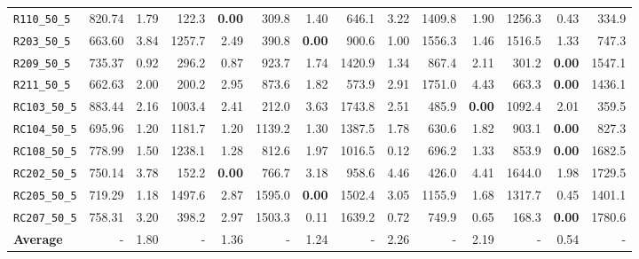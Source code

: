 \begin{table}[ht]
\begin{adjustbox}{width=\textwidth}
\begin{tabular}{l r r r @{\hspace{8pt}} r r @{\hspace{8pt}} r r @{\hspace{8pt}} r r @{\hspace{8pt}} r r @{\hspace{8pt}} r r @{\hspace{8pt}}}
\texttt{R110\_50\_5} & 820.74 & 1.79 & 122.3 & \textbf{0.00} & 309.8 & 1.40 & 646.1 & 3.22 & 1409.8 & 1.90 & 1256.3 & 0.43 & 334.9 \\
\texttt{R203\_50\_5} & 663.60 & 3.84 & 1257.7 & 2.49 & 390.8 & \textbf{0.00} & 900.6 & 1.00 & 1556.3 & 1.46 & 1516.5 & 1.33 & 747.3 \\
\texttt{R209\_50\_5} & 735.37 & 0.92 & 296.2 & 0.87 & 923.7 & 1.74 & 1420.9 & 1.34 & 867.4 & 2.11 & 301.2 & \textbf{0.00} & 1547.1 \\
\texttt{R211\_50\_5} & 662.63 & 2.00 & 200.2 & 2.95 & 873.6 & 1.82 & 573.9 & 2.91 & 1751.0 & 4.43 & 663.3 & \textbf{0.00} & 1436.1 \\
\texttt{RC103\_50\_5} & 883.44 & 2.16 & 1003.4 & 2.41 & 212.0 & 3.63 & 1743.8 & 2.51 & 485.9 & \textbf{0.00} & 1092.4 & 2.01 & 359.5 \\
\texttt{RC104\_50\_5} & 695.96 & 1.20 & 1181.7 & 1.20 & 1139.2 & 1.30 & 1387.5 & 1.78 & 630.6 & 1.82 & 903.1 & \textbf{0.00} & 827.3 \\
\texttt{RC108\_50\_5} & 778.99 & 1.50 & 1238.1 & 1.28 & 812.6 & 1.97 & 1016.5 & 0.12 & 696.2 & 1.33 & 853.9 & \textbf{0.00} & 1682.5 \\
\texttt{RC202\_50\_5} & 750.14 & 3.78 & 152.2 & \textbf{0.00} & 766.7 & 3.18 & 958.6 & 4.46 & 426.0 & 4.41 & 1644.0 & 1.98 & 1729.5 \\
\texttt{RC205\_50\_5} & 719.29 & 1.18 & 1497.6 & 2.87 & 1595.0 & \textbf{0.00} & 1502.4 & 3.05 & 1155.9 & 1.68 & 1317.7 & 0.45 & 1401.1 \\
\texttt{RC207\_50\_5} & 758.31 & 3.20 & 398.2 & 2.97 & 1503.3 & 0.11 & 1639.2 & 0.72 & 749.9 & 0.65 & 168.3 & \textbf{0.00} & 1780.6 \\
\midrule
\textbf{Average} & - & 1.80 & - & 1.36 & - & 1.24 & - & 2.26 & - & 2.19 & - & 0.54 & - \\
\bottomrule
\end{tabular}
\end{adjustbox}
\end{table}